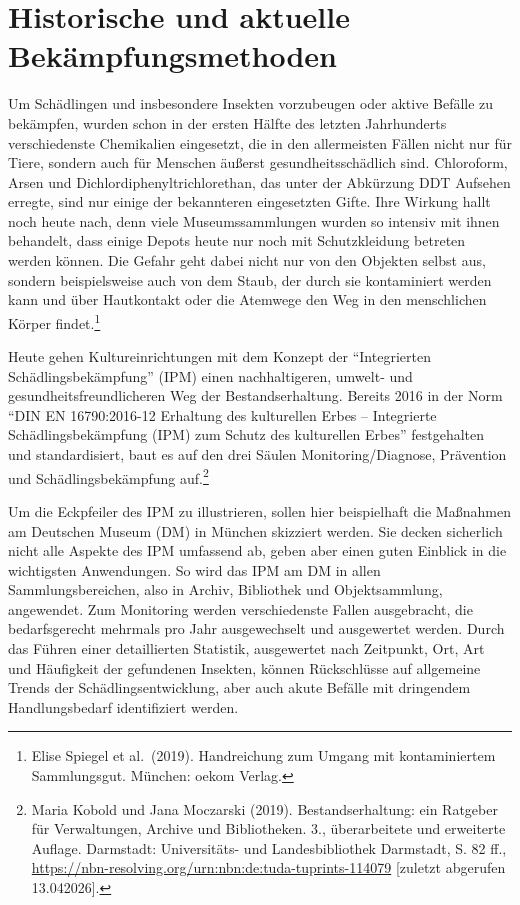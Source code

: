 \documentclass[a4paper,
fontsize=11pt,
oneside,
numbers=noperiodatend,
parskip=half-,
bibliography=totoc,
final
]{scrartcl}
\begin{document}
\section{Historische und aktuelle
Bekämpfungsmethoden}\label{historische-und-aktuelle-bekuxe4mpfungsmethoden}

Um Schädlingen und insbesondere Insekten vorzubeugen oder aktive Befälle
zu bekämpfen, wurden schon in der ersten Hälfte des letzten Jahrhunderts
verschiedenste Chemikalien eingesetzt, die in den allermeisten Fällen
nicht nur für Tiere, sondern auch für Menschen äußerst
gesundheitsschädlich sind. Chloroform, Arsen und
Dichlordiphenyltrichlorethan, das unter der Abkürzung DDT Aufsehen
erregte, sind nur einige der bekannteren eingesetzten Gifte. Ihre
Wirkung hallt noch heute nach, denn viele Museumssammlungen wurden so
intensiv mit ihnen behandelt, dass einige Depots heute nur noch mit
Schutzkleidung betreten werden können. Die Gefahr geht dabei nicht nur
von den Objekten selbst aus, sondern beispielsweise auch von dem Staub,
der durch sie kontaminiert werden kann und über Hautkontakt oder die
Atemwege den Weg in den menschlichen Körper findet.\footnote{Elise
  Spiegel et al.~(2019). Handreichung zum Umgang mit kontaminiertem
  Sammlungsgut. München: oekom Verlag.}

Heute gehen Kultureinrichtungen mit dem Konzept der
\enquote{Integrierten Schädlingsbekämpfung} (IPM) einen nachhaltigeren,
umwelt- und gesundheitsfreundlicheren Weg der Bestandserhaltung. Bereits
2016 in der Norm \enquote{DIN EN 16790:2016-12 Erhaltung des kulturellen
Erbes -- Integrierte Schädlingsbekämpfung (IPM) zum Schutz des
kulturellen Erbes} festgehalten und standardisiert, baut es auf den drei
Säulen Monitoring/Diagnose, Prävention und Schädlingsbekämpfung
auf.\footnote{Maria Kobold und Jana Moczarski (2019). Bestandserhaltung:
  ein Ratgeber für Verwaltungen, Archive und Bibliotheken. 3.,
  überarbeitete und erweiterte Auflage. Darmstadt: Universitäts- und
  Landesbibliothek Darmstadt, S. 82 ff.,
  \url{https://nbn-resolving.org/urn:nbn:de:tuda-tuprints-114079}
  {[}zuletzt abgerufen 13.042026{]}.}

Um die Eckpfeiler des IPM zu illustrieren, sollen hier beispielhaft die
Maßnahmen am Deutschen Museum (DM) in München skizziert werden. Sie
decken sicherlich nicht alle Aspekte des IPM umfassend ab, geben aber
einen guten Einblick in die wichtigsten Anwendungen. So wird das IPM am
DM in allen Sammlungsbereichen, also in Archiv, Bibliothek und
Objektsammlung, angewendet. Zum Monitoring werden verschiedenste Fallen
ausgebracht, die bedarfsgerecht mehrmals pro Jahr ausgewechselt und
ausgewertet werden. Durch das Führen einer detaillierten Statistik,
ausgewertet nach Zeitpunkt, Ort, Art und Häufigkeit der gefundenen
Insekten, können Rückschlüsse auf allgemeine Trends der
Schädlingsentwicklung, aber auch akute Befälle mit dringendem
Handlungsbedarf identifiziert werden.
\end{document}
